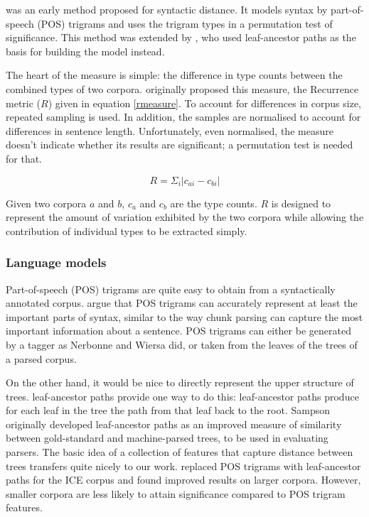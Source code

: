 \documentclass[11pt]{article}
\begin{document}
 was an early method proposed for syntactic
distance.  It models syntax by part-of-speech (POS) trigrams and uses
the trigram types in a permutation test of significance. This method was
extended by , who used 
leaf-ancestor paths as the basis for building the model instead.

The heart of the measure is simple: the difference in type counts
between the combined types of two corpora. 
originally proposed this measure, the {\sc Recurrence}
metric ($R$) given in equation \ref{rmeasure}. To account for differences
in corpus size, repeated sampling is used. In addition, the samples
are normalised to account for differences in sentence length.
Unfortunately, even normalised, the measure doesn't indicate whether
its results are significant; a permutation test is needed for that.

\begin{equation}
R = \Sigma_i |c_{ai} - c_{bi}|
\label{rmeasure}
\end{equation}

Given two corpora $a$ and $b$, $c_a$ and $c_b$ are the type counts.
$R$ is designed to represent the amount of variation exhibited by the
two corpora while allowing the contribution of individual types to be
extracted simply.


\subsubsection{Language models}
Part-of-speech (POS) trigrams are quite easy to obtain from a syntactically
annotated corpus.  argue that POS trigrams
can accurately represent at least the important parts of syntax,
similar to the way chunk parsing can capture the most important
information about a sentence. POS trigrams can either be generated by
a tagger as Nerbonne and Wiersa did, or taken from the leaves of
the trees of a parsed corpus.

On the other hand, it would be nice to directly represent the upper
structure of trees.  leaf-ancestor paths provide one way to
do this: leaf-ancestor paths produce for each leaf in the tree the
path from that leaf back to the root. Sampson originally developed
leaf-ancestor paths as an improved measure of similarity between
gold-standard and machine-parsed trees, to be used in evaluating
parsers. The basic idea of a collection of features that capture
distance between trees transfers quite nicely to our
work.  replaced POS trigrams with leaf-ancestor
paths for the ICE corpus and found improved results on larger
corpora. However, smaller corpora are less likely to attain significance
compared to POS trigram features.
\end{document}
